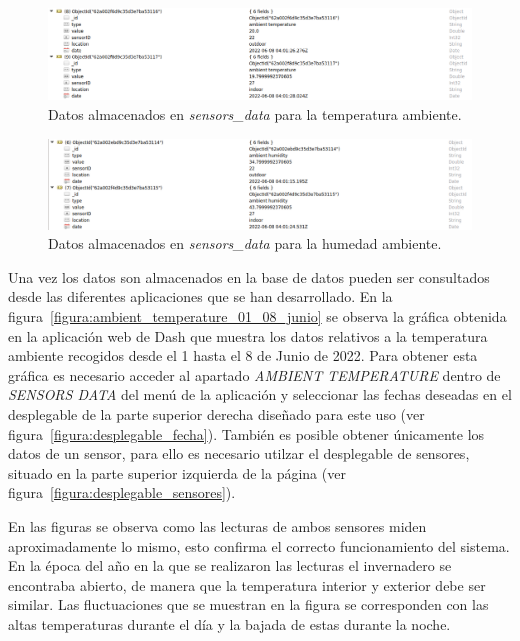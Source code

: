 \documentclass[a4paper, 12pt, oneside]{book}
\begin{document}
\begin{figure}[H]
	\centering
    \includegraphics[width=12cm, keepaspectratio]{img/robo3t_ambient_temperature}
    \caption{Datos almacenados en \textit{sensors\_data} para la temperatura ambiente.}
    \label{figura:robo3t_ambient_temperature}
\end{figure}
\begin{figure}[H]
	\centering
    \includegraphics[width=12cm, keepaspectratio]{img/robo3t_ambient_humidity}
    \caption{Datos almacenados en \textit{sensors\_data} para la humedad ambiente.}
    \label{figura:robo3t_ambient_humidity}
\end{figure} 

Una vez los datos son almacenados en la base de datos pueden ser consultados desde las diferentes aplicaciones que se han desarrollado.
En la figura~\ref{figura:ambient_temperature_01_08_junio} se observa la gráfica obtenida en la aplicación web de Dash que muestra los datos relativos a la temperatura ambiente recogidos desde el 1 hasta el 8 de Junio de 2022. Para obtener esta gráfica es necesario acceder al apartado \textit{AMBIENT TEMPERATURE} dentro de \textit{SENSORS DATA} del menú de la aplicación y seleccionar las fechas deseadas en el desplegable de la parte superior derecha diseñado para este uso (ver figura~\ref{figura:desplegable_fecha}). También es posible obtener únicamente los datos de un sensor, para ello es necesario utilzar el desplegable de sensores, situado en la parte superior izquierda de la página (ver figura~\ref{figura:desplegable_sensores}).

En las figuras se observa como las lecturas de ambos sensores miden aproximadamente lo mismo, esto confirma el correcto funcionamiento del sistema. En la época del año en la que se realizaron las lecturas el invernadero se encontraba abierto, de manera que la temperatura interior y exterior debe ser similar. Las fluctuaciones que se muestran en la figura se corresponden con las altas temperaturas durante el día y la bajada de estas durante la noche.
\end{document}
